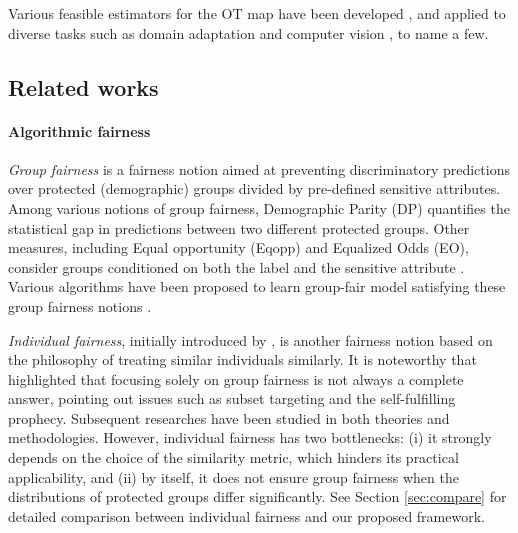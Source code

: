 \documentclass[10pt]{article} %
\begin{document}
Various feasible estimators for the OT map have been developed \citep{NIPS2013_af21d0c9, 10.5555/3157382.3157482}, and applied to diverse tasks such as domain adaptation \citep{10.1007/978-3-030-01225-0_28, pmlr-v89-forrow19a} and computer vision \citep{7053911, pmlr-v37-li15, salimans2018improving}, to name a few.


\subsection{Related works}\label{sec:related}

\paragraph{Algorithmic fairness}

\textit{Group fairness} is a fairness notion aimed at preventing discriminatory predictions over protected (demographic) groups divided by pre-defined sensitive attributes.
Among various notions of group fairness, Demographic Parity (DP) \citep{calders2009building, feldman2015certifying, ADW19, pmlr-v115-jiang20a, NEURIPS2020_51cdbd26} quantifies the statistical gap in predictions between two different protected groups.
Other measures, including Equal opportunity (Eqopp) and Equalized Odds (EO), consider groups conditioned on both the label and the sensitive attribute \citep{NIPS2016_9d268236}.
Various algorithms have been proposed to learn group-fair model satisfying these group fairness notions \citep{zafar2017fairness, donini2018empirical, pmlr-v80-agarwal18a, Madras2018LearningAF, zafar2019fairness, chuang2021fair, pmlr-v162-kim22b}.

\textit{Individual fairness}, initially introduced by \citet{10.1145/2090236.2090255}, is another fairness notion based on the philosophy of treating similar individuals similarly.
It is noteworthy that \citet{10.1145/2090236.2090255} highlighted that focusing solely on group fairness is not always a complete answer, pointing out issues such as subset targeting and the self-fulfilling prophecy.
Subsequent researches \citep{pmlr-v80-yona18a, Yurochkin2020Training, yurochkin2021sensei, https://doi.org/10.48550/arxiv.2110.13796} have been studied in both theories and methodologies.
However, individual fairness has two bottlenecks: (i) it strongly depends on the choice of the similarity metric, which hinders its practical applicability, and (ii) by itself, it does not ensure group fairness when the distributions of protected groups differ significantly.
See Section \ref{sec:compare} for detailed comparison between individual fairness and our proposed framework.
\end{document}
